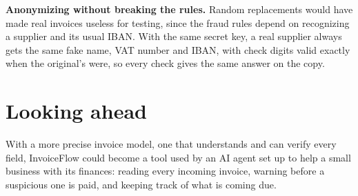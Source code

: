 \documentclass[11pt,a4paper]{article}
\begin{document}
\textbf{Anonymizing without breaking the rules.} Random replacements would have made real
invoices useless for testing, since the fraud rules depend on recognizing a supplier and its
usual IBAN. With the same secret key, a real supplier always gets the same fake name, VAT number
and IBAN, with check digits valid exactly when the original's were, so every check gives the
same answer on the copy.

\section*{Looking ahead}

With a more precise invoice model, one that understands and can verify every field, InvoiceFlow
could become a tool used by an AI agent set up to help a small business with its finances:
reading every incoming invoice, warning before a suspicious one is paid, and keeping track of
what is coming due.
\end{document}
